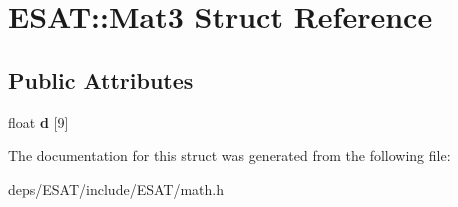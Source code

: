 \hypertarget{struct_e_s_a_t_1_1_mat3}{}\section{E\+S\+AT\+:\+:Mat3 Struct Reference}
\label{struct_e_s_a_t_1_1_mat3}
\subsection*{Public Attributes}
\begin{DoxyCompactItemize}
\item 
\mbox{\label{struct_e_s_a_t_1_1_mat3_a5f4428530a273807e3f597903a2d8fe9}} 
float {\bfseries d} \mbox{[}9\mbox{]}
\end{DoxyCompactItemize}


The documentation for this struct was generated from the following file\+:\begin{DoxyCompactItemize}
\item 
deps/\+E\+S\+A\+T/include/\+E\+S\+A\+T/math.\+h\end{DoxyCompactItemize}
